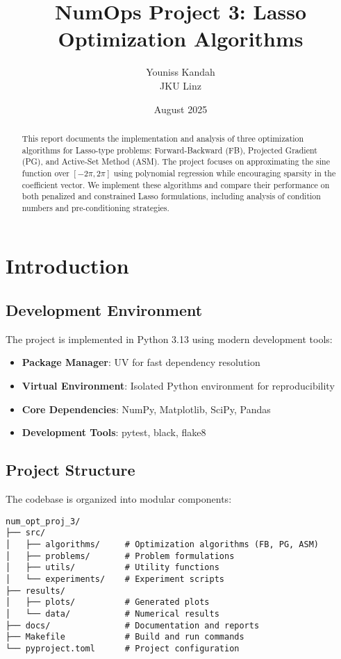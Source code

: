 \documentclass[11pt,a4paper]{article}
\title{NumOps Project 3: Lasso Optimization Algorithms}
\author{Youniss Kandah\\JKU Linz}
\date{August 2025}
\begin{document}
\maketitle

\begin{abstract}
This report documents the implementation and analysis of three optimization algorithms for Lasso-type problems: Forward-Backward (FB), Projected Gradient (PG), and Active-Set Method (ASM). The project focuses on approximating the sine function over $[-2\pi, 2\pi]$ using polynomial regression while encouraging sparsity in the coefficient vector. We implement these algorithms and compare their performance on both penalized and constrained Lasso formulations, including analysis of condition numbers and pre-conditioning strategies.
\end{abstract}

\tableofcontents
\newpage

\section{Introduction}

\subsection{Development Environment}

The project is implemented in Python 3.13 using modern development tools:

\begin{itemize}
    \item \textbf{Package Manager}: UV for fast dependency resolution
    \item \textbf{Virtual Environment}: Isolated Python environment for reproducibility
    \item \textbf{Core Dependencies}: NumPy, Matplotlib, SciPy, Pandas
    \item \textbf{Development Tools}: pytest, black, flake8
\end{itemize}

\subsection{Project Structure}

The codebase is organized into modular components:

\begin{verbatim}
num_opt_proj_3/
├── src/
│   ├── algorithms/     # Optimization algorithms (FB, PG, ASM)
│   ├── problems/       # Problem formulations
│   ├── utils/          # Utility functions
│   └── experiments/    # Experiment scripts
├── results/
│   ├── plots/          # Generated plots
│   └── data/           # Numerical results
├── docs/               # Documentation and reports
├── Makefile            # Build and run commands
└── pyproject.toml      # Project configuration
\end{verbatim}
\end{document}
